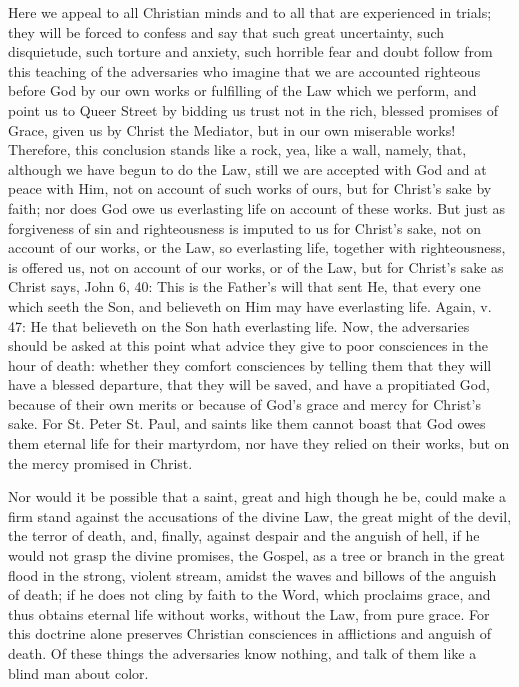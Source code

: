 Here we appeal to all Christian minds and to all that are experienced
in trials; they will be forced to confess and say that such great
uncertainty, such disquietude, such torture and anxiety, such
horrible fear and doubt follow from this teaching of the adversaries
who imagine that we are accounted righteous before God by our own
works or fulfilling of the Law which we perform, and point us to
Queer Street by bidding us trust not in the rich, blessed promises of
Grace, given us by Christ the Mediator, but in our own miserable
works!  Therefore, this conclusion stands like a rock, yea, like a
wall, namely, that, although we have begun to do the Law, still we
are accepted with God and at peace with Him, not on account of such
works of ours, but for Christ's sake by faith; nor does God owe us
everlasting life on account of these works.  But just as forgiveness
of sin and righteousness is imputed to us for Christ's sake, not on
account of our works, or the Law, so everlasting life, together with
righteousness, is offered us, not on account of our works, or of the
Law, but for Christ's sake as Christ says, John 6, 40: This is the
Father's will that sent He, that every one which seeth the Son, and
believeth on Him may have everlasting life.  Again, v. 47: He that
believeth on the Son hath everlasting life.  Now, the adversaries
should be asked at this point what advice they give to poor
consciences in the hour of death: whether they comfort consciences by
telling them that they will have a blessed departure, that they will
be saved, and have a propitiated God, because of their own merits or
because of God's grace and mercy for Christ's sake.  For St. Peter St.
Paul, and saints like them cannot boast that God owes them eternal
life for their martyrdom, nor have they relied on their works, but on
the mercy promised in Christ.

Nor would it be possible that a saint, great and high though he be,
could make a firm stand against the accusations of the divine Law,
the great might of the devil, the terror of death, and, finally,
against despair and the anguish of hell, if he would not grasp the
divine promises, the Gospel, as a tree or branch in the great flood
in the strong, violent stream, amidst the waves and billows of the
anguish of death; if he does not cling by faith to the Word, which
proclaims grace, and thus obtains eternal life without works, without
the Law, from pure grace.  For this doctrine alone preserves
Christian consciences in afflictions and anguish of death.  Of these
things the adversaries know nothing, and talk of them like a blind
man about color.

